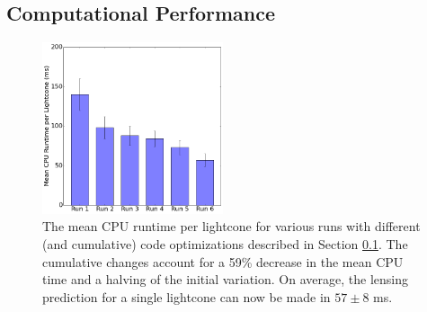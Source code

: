 \documentclass[%
 reprint,
 amsmath,amssymb,
 aps,nofootinbib
]{revtex4-1}
\begin{document}
\subsection{Computational Performance} \label{comp_perform}

\begin{figure}
    \centering
    \includegraphics[width=0.475\textwidth]{figs-swe/thesis/profile_bar.png}
    \captionsetup{justification=raggedright,singlelinecheck=false}
    \caption{The mean CPU runtime per lightcone for various runs with different (and cumulative) code optimizations described in Section \ref{comp_perform}. The cumulative changes account for a 59\% decrease in the mean CPU time and a halving of the initial variation. On average, the lensing prediction for a single lightcone can now be made in $57\pm8$ ms.}
    \label{fig:cpu_plot}
\end{figure}
\end{document}
